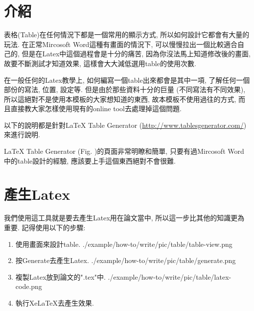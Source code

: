 \section{介紹}

表格(Table)在任何情況下都是一個常用的顯示方式, 所以如何設計它都會有大量的玩法. 在正常Mircosoft Word這種有畫面的情況下, 可以慢慢拉出一個比較適合自己的, 但是在Latex中這個過程會是十分的痛苦, 因為你沒法馬上知道修改後的畫面, 故要不斷測試才知道效果, 這樣會大大減低選用table的使用次數.

在一般任何的Latex教學上, 如何編寫一個table出來都會是其中一項, 了解任何一個部份的寫法, 位置, 設定等. 但是由於那些資料十分的巨量 (不同寫法有不同效果), 所以這絕對不是使用本模板的大家想知道的東西, 故本模板不使用過往的方式, 而且直接教大家怎樣使用現有的online tool去處理掉這個問題.

以下的說明都是針對LaTeX Table Generator (\url{http://www.tablesgenerator.com/})來進行說明.

LaTeX Table Generator (Fig. )的頁面非常明瞭和簡單, 只要有過Mircosoft Word中的table設計的經驗, 應該要上手這個東西絕對不會很難.

\newpage
{}

\newpage
\section{產生Latex}

  我們使用這工具就是要去產生Latex用在論文當中, 所以這一步比其他的知識更為重要. 記得使用以下的步驟:

  \begin{enumerate}
  \item
  {
    使用畫面來設計table.
    \InsertCenterImage
      {./example/how-to/write/pic/table/table-view.png}
  } %

  \item
  {
    按Generate去產生Latex.
    \InsertCenterImage
      {./example/how-to/write/pic/table/generate.png}
  } %

  \item
  {
    複製Latex放到論文的".tex"中.
    \InsertCenterImage
      {./example/how-to/write/pic/table/latex-code.png}
  } %

  \item
  {
    執行XeLaTeX去產生效果.
  } %
  \end{enumerate}

